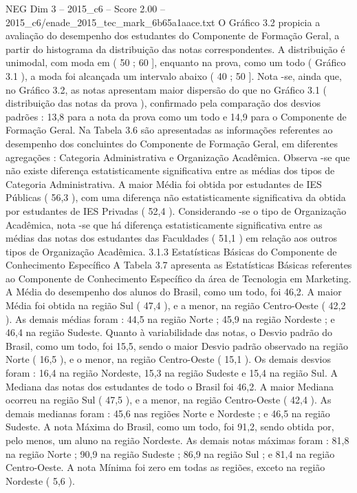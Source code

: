 \begin{textsample}{NEG Dim 3 – 2015\_c6 – Score 2.00 – 2015\_c6/enade\_2015\_tec\_mark\_6b65a1aace.txt}
O Gráfico 3.2 propicia a avaliação do desempenho dos estudantes do Componente de Formação Geral, a partir do histograma da distribuição das notas correspondentes.
A distribuição é unimodal, com moda em ( 50 ; 60 ], enquanto na prova, como um todo ( Gráfico 3.1 ), a moda foi alcançada um intervalo abaixo ( 40 ; 50 ].
Nota -se, ainda que, no Gráfico 3.2, as notas apresentam maior dispersão do que no Gráfico 3.1 ( distribuição das notas da prova ), confirmado pela comparação dos desvios padrões : 13,8 para a nota da prova como um todo e 14,9 para o Componente de Formação Geral.
Na Tabela 3.6 são apresentadas as informações referentes ao desempenho dos concluintes do Componente de Formação Geral, em diferentes agregações : Categoria Administrativa e Organização Acadêmica.
Observa -se que não existe diferença estatisticamente significativa entre as médias dos tipos de Categoria Administrativa.
A maior Média foi obtida por estudantes de IES Públicas ( 56,3 ), com uma diferença não estatisticamente significativa da obtida por estudantes de IES Privadas ( 52,4 ).
Considerando -se o tipo de Organização Acadêmica, nota -se que há diferença estatisticamente significativa entre as médias das notas dos estudantes das Faculdades ( 51,1 ) em relação aos outros tipos de Organização Acadêmica. 3.1.3 Estatísticas Básicas do Componente de Conhecimento Específico A Tabela 3.7 apresenta as Estatísticas Básicas referentes ao Componente de Conhecimento Específico da área de Tecnologia em Marketing.
A Média do desempenho dos alunos do Brasil, como um todo, foi 46,2.
A maior Média foi obtida na região Sul ( 47,4 ), e a menor, na região Centro-Oeste ( 42,2 ).
As demais médias foram : 44,5 na região Norte ; 45,9 na região Nordeste ; e 46,4 na região Sudeste.
Quanto à variabilidade das notas, o Desvio padrão do Brasil, como um todo, foi 15,5, sendo o maior Desvio padrão observado na região Norte ( 16,5 ), e o menor, na região Centro-Oeste ( 15,1 ).
Os demais desvios foram : 16,4 na região Nordeste, 15,3 na região Sudeste e 15,4 na região Sul.
A Mediana das notas dos estudantes de todo o Brasil foi 46,2.
A maior Mediana ocorreu na região Sul ( 47,5 ), e a menor, na região Centro-Oeste ( 42,4 ).
As demais medianas foram : 45,6 nas regiões Norte e Nordeste ; e 46,5 na região Sudeste.
A nota Máxima do Brasil, como um todo, foi 91,2, sendo obtida por, pelo menos, um aluno na região Nordeste.
As demais notas máximas foram : 81,8 na região Norte ; 90,9 na região Sudeste ; 86,9 na região Sul ; e 81,4 na região Centro-Oeste.
A nota Mínima foi zero em todas as regiões, exceto na região Nordeste ( 5,6 ).

\end{textsample}
